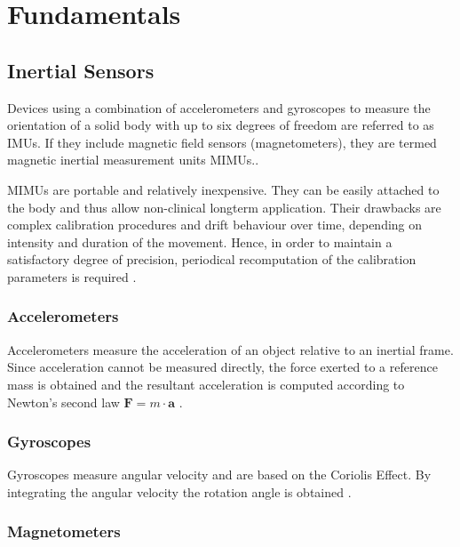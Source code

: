 \chapter{Fundamentals}
\label{ch:Fundamentals}

\section{Inertial Sensors}

Devices using a combination of accelerometers and gyroscopes to measure the orientation of a solid body with up to six degrees of freedom are referred to as \gls{IMUs}. If they include magnetic field sensors (magnetometers), they are termed magnetic inertial measurement units \gls{MIMUs}.\cite{olivares_vicente_signal_2013}.

MIMUs are portable and relatively inexpensive. They can be easily attached to the body and thus allow non-clinical longterm application. Their drawbacks are complex calibration procedures and drift behaviour over time, depending on intensity and duration of the movement. Hence, in order to maintain a satisfactory degree of precision, periodical recomputation of the calibration parameters is required \cite{olivares_vicente_signal_2013}.

\subsection{Accelerometers}

Accelerometers measure the acceleration of an object relative to an inertial frame. Since acceleration cannot be measured directly, the force exerted to a reference mass is obtained and the resultant acceleration is computed according to Newton's second law $ \mathbf{F} = m \cdot \mathbf a $ \cite{encyclopedia_britannica_accelerometer_2014}.

\subsection{Gyroscopes}

Gyroscopes measure angular velocity and are based on the Coriolis Effect. By integrating the angular velocity the rotation angle is obtained \cite{olivares_vicente_signal_2013}.

\subsection{Magnetometers}

